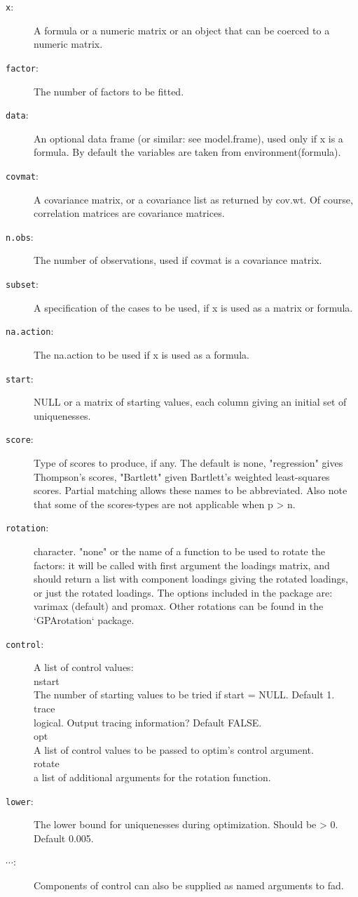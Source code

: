 \documentclass{article}
\begin{document}
\begin{description}
\item[\texttt{x}:] A formula or a numeric matrix or an object that can be coerced to a numeric matrix. 
\item[\texttt{factor}:] The number of factors to be fitted.
\item[\texttt{data}:] An optional data frame (or similar: see model.frame), used only if x is a formula. By default the variables are taken from environment(formula).
\item[\texttt{covmat}:] A covariance matrix, or a covariance list as returned by cov.wt. Of course, correlation matrices are covariance matrices. 
\item[\texttt{n.obs}:] The number of observations, used if covmat is a covariance matrix. 
\item[\texttt{subset}:] A specification of the cases to be used, if x is used as a matrix or formula. 
\item[\texttt{na.action}:] The na.action to be used if x is used as a formula. 
\item[\texttt{start}:] NULL or a matrix of starting values, each column giving an initial set of uniquenesses.
\item[\texttt{score}:] Type of scores to produce, if any. The default is none, "regression" gives Thompson's scores, "Bartlett" given Bartlett's weighted least-squares scores. Partial matching allows these names to be abbreviated. Also note that some of the scores-types are not applicable when p > n.
\item[\texttt{rotation}:] character. "none" or the name of a function to be used to rotate the factors: it will be called with first argument the loadings matrix, and should return a list with component loadings giving the rotated loadings, or just the rotated loadings. The options included in the package are: varimax (default) and promax. Other rotations can be found in the `GPArotation` package.
\item[\texttt{control}:] A list of control values:\\
nstart\\
The number of starting values to be tried if start = NULL. Default 1.\\
trace\\
logical. Output tracing information? Default FALSE.\\
opt\\
A list of control values to be passed to optim's control argument.\\
rotate\\
a list of additional arguments for the rotation function.
\item[\texttt{lower}:] The lower bound for uniquenesses during optimization. Should be > 0. Default 0.005. 
\item[\texttt{$\cdots$}:] Components of control can also be supplied as named arguments to fad. 
\end{description}
\end{document}
